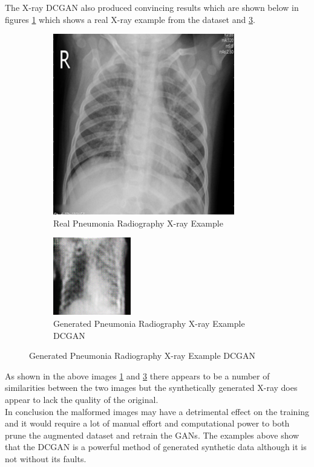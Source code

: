 The X-ray DCGAN also produced convincing results which are shown below in figures \ref{fig:Real Pneumonia Radiography X-ray Example} which shows a real X-ray example from the dataset and \ref{fig:Synthetically Generated Pneumonia Radiography X-ray(DCGAN)}.
 \begin{figure}[H]
    \centering
    \begin{subfigure}{.4\textwidth}
    \centering
      \includegraphics[width=.4\linewidth,keepaspectratio]{Images/ExampleOfPneumoniaXrayRadiographyCOVID19.png}
      \caption{Real Pneumonia Radiography X-ray Example}
      \label{fig:Real Pneumonia Radiography X-ray Example}
    \end{subfigure}\hfill%
    \begin{subfigure}{.4\textwidth}
    \centering
      \includegraphics[width=.4\linewidth,keepaspectratio]{Images/ExampleOfSyntheticallyGeneratedXrayPneumoniaCOVID19RadiographyDCGAN.png}
      \caption{Generated Pneumonia Radiography X-ray Example DCGAN}
      \label{fig:Synthetically Generated Pneumonia Radiography X-ray(DCGAN)}
    \end{subfigure}\hfill%
\end{figure}
As shown in the above images \ref{fig:Real Pneumonia Radiography X-ray Example} and \ref{fig:Synthetically Generated Pneumonia Radiography X-ray(DCGAN)} there appears to be a number of similarities between the two images but the synthetically generated X-ray does appear to lack the quality of the original.
\\
In conclusion the malformed images may have a detrimental effect on the training and it would require a lot of manual effort and computational power to both prune the augmented dataset and retrain the GANs.  The examples above show that the DCGAN is a powerful method of generated synthetic data although it is not without its faults.
